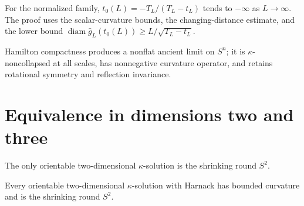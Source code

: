 \begin{proposition}
\label{prop:chow-iii-normalized-family-ancient}


For the normalized family, $t_0(L)=-T_L/(T_L-t_L)$ tends to $-\infty$ as
$L\to\infty$.  The proof uses the scalar-curvature bounds, the changing-distance
estimate, and the lower bound $\operatorname{diam}\hat g_L(t_0(L))\ge
L/\sqrt{T_L-t_L}$.
\end{proposition}

\begin{proposition}
\label{prop:chow-iii-perelman-limit-properties}


Hamilton compactness produces a nonflat ancient limit on $S^n$; it is
$\kappa$-noncollapsed at all scales, has nonnegative curvature operator, and
retains rotational symmetry and reflection invariance.
\end{proposition}

\section{Equivalence in dimensions two and three}

\begin{theorem}
\label{thm:chow-iii-2d-kappa}

The only orientable two-dimensional $\kappa$-solution is the shrinking round
$S^2$.
\end{theorem}

\begin{corollary}
\label{cor:chow-iii-2d-harnack}


Every orientable two-dimensional $\kappa$-solution with Harnack has bounded
curvature and is the shrinking round $S^2$.
\end{corollary}


